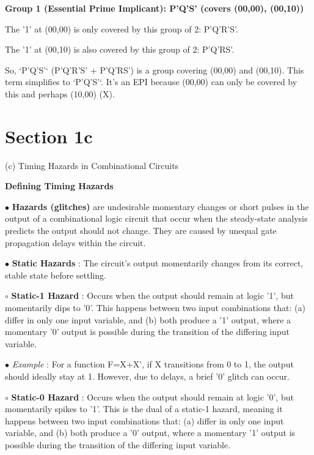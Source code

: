 \documentclass{article}
\begin{document}
\begin{itemize}
\begin{itemize}
\begin{enumerate}
\begin{itemize}
                \begin{itemizeDeep}
                    \item \textbf{Group 1 (Essential Prime Implicant): P'Q'S' (covers (00,00), (00,10))}
                    \item The '1' at (00,00) is only covered by this group of 2: P'Q'R'S'.
                    \item The '1' at (00,10) is also covered by this group of 2: P'Q'RS'.
                    \item So, `P'Q'S'` (P'Q'R'S' + P'Q'RS') is a group covering (00,00) and (00,10). This term simplifies to `P'Q'S'`. It's an EPI because (00,00) can only be covered by this and perhaps (10,00) (X).
                \end{itemizeDeep}
        \end{itemize}
    \end{enumerate}
\end{itemize}


\section{Section 1c}

(c) Timing Hazards in Combinational Circuits

\textbf{Defining Timing Hazards}

$\bullet$ \textbf{Hazards (glitches)} are undesirable momentary changes or short pulses in the output of a combinational logic circuit that occur when the steady-state analysis predicts the output should not change. They are caused by unequal gate propagation delays within the circuit.

$\bullet$ \textbf{Static Hazards} : The circuit's output momentarily changes from its correct, stable state before settling.

    $\circ$ \textbf{Static-1 Hazard} : Occurs when the output should remain at logic '1', but momentarily dips to '0'. This happens between two input combinations that: (a) differ in only one input variable, and (b) both produce a '1' output, where a momentary '0' output is possible during the transition of the differing input variable.

        $\bullet$ \textit{Example} : For a function F=X+X', if X transitions from 0 to 1, the output should ideally stay at 1. However, due to delays, a brief '0' glitch can occur.

    $\circ$ \textbf{Static-0 Hazard} : Occurs when the output should remain at logic '0', but momentarily spikes to '1'. This is the dual of a static-1 hazard, meaning it happens between two input combinations that: (a) differ in only one input variable, and (b) both produce a '0' output, where a momentary '1' output is possible during the transition of the differing input variable.


\end{itemize}
\end{document}
